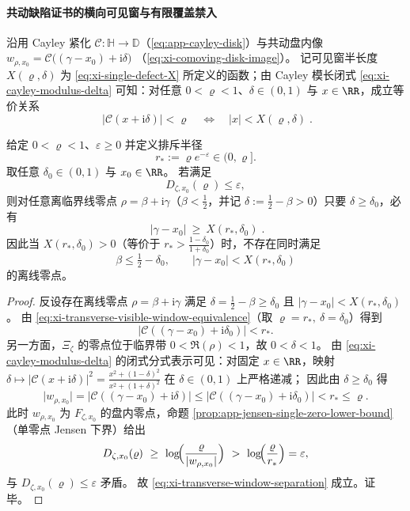 \paragraph{共动缺陷证书的横向可见窗与有限覆盖禁入}\label{par:xi-comoving-transverse-window-band-exclusion}
沿用 Cayley 紧化 \(\mathcal{C}:\mathbb{H}\to\mathbb{D}\)（\eqref{eq:app-cayley-disk}）与共动盘内像
\(
w_{\rho,x_0}=\mathcal{C}\bigl((\gamma-x_0)+\mathrm{i}\delta\bigr)
\)
（\eqref{eq:xi-comoving-disk-image}）。
记可见窗半长度 \(X(\varrho,\delta)\) 为 \eqref{eq:xi-single-defect-X} 所定义的函数；由 Cayley 模长闭式 \eqref{eq:xi-cayley-modulus-delta} 可知：对任意 \(0<\varrho<1\)、\(\delta\in(0,1)\) 与 \(x\in\RR\)，成立等价关系
\begin{equation}\label{eq:xi-transverse-visible-window-equivalence}
\boxed{\;
\bigl|\mathcal{C}(x+\mathrm{i}\delta)\bigr|<\varrho
\quad\Longleftrightarrow\quad
|x|<X(\varrho,\delta)\; }.
\end{equation}

\begin{theorem}\label{thm:xi-comoving-defect-transverse-visible-window}
给定 \(0<\varrho<1\)、\(\varepsilon\ge 0\) 并定义排斥半径
\[
r_\ast:=\varrho e^{-\varepsilon}\in(0,\varrho].
\]
取任意 \(\delta_0\in(0,1)\) 与 \(x_0\in\RR\)。
若满足
\[
D_{\zeta,x_0}(\varrho)\le \varepsilon,
\]
则对任意离临界线零点 \(\rho=\beta+\mathrm{i}\gamma\)（\(\beta<\tfrac12\)，并记 \(\delta:=\tfrac12-\beta>0\)）只要 \(\delta\ge\delta_0\)，必有
\begin{equation}\label{eq:xi-transverse-window-separation}
\boxed{\;
|\gamma-x_0|\ \ge\ X(r_\ast,\delta_0)\; }.
\end{equation}
因此当 \(X(r_\ast,\delta_0)>0\)（等价于 \(r_\ast>\frac{1-\delta_0}{1+\delta_0}\)）时，不存在同时满足
\[
\beta\le\tfrac12-\delta_0,
\qquad
|\gamma-x_0|<X(r_\ast,\delta_0)
\]
的离线零点。
\end{theorem}

\begin{proof}
反设存在离线零点 \(\rho=\beta+\mathrm{i}\gamma\) 满足 \(\delta=\tfrac12-\beta\ge\delta_0\) 且
\(
|\gamma-x_0|<X(r_\ast,\delta_0)
\)。
由 \eqref{eq:xi-transverse-visible-window-equivalence}（取 \(\varrho=r_\ast,\ \delta=\delta_0\)）得到
\[
\bigl|\mathcal{C}((\gamma-x_0)+\mathrm{i}\delta_0)\bigr|<r_\ast.
\]
另一方面，\(\Xi_{\zeta}\) 的零点位于临界带 \(0<\Re(\rho)<1\)，故 \(0<\delta<1\)。
由 \eqref{eq:xi-cayley-modulus-delta} 的闭式分式表示可见：对固定 \(x\in\RR\)，映射
\(
\delta\mapsto |\mathcal{C}(x+\mathrm{i}\delta)|^2
=\frac{x^2+(1-\delta)^2}{x^2+(1+\delta)^2}
\)
在 \(\delta\in(0,1)\) 上严格递减；
因此由 \(\delta\ge\delta_0\) 得
\[
\bigl|w_{\rho,x_0}\bigr|
=\bigl|\mathcal{C}((\gamma-x_0)+\mathrm{i}\delta)\bigr|
\le \bigl|\mathcal{C}((\gamma-x_0)+\mathrm{i}\delta_0)\bigr|
<r_\ast\le\varrho.
\]
此时 \(w_{\rho,x_0}\) 为 \(F_{\zeta,x_0}\) 的盘内零点，命题 \ref{prop:app-jensen-single-zero-lower-bound}（单零点 Jensen 下界）给出
\[
D_{\zeta,x_0}(\varrho)\ \ge\ \log\!\Bigl(\frac{\varrho}{|w_{\rho,x_0}|}\Bigr)\ >\ \log\!\Bigl(\frac{\varrho}{r_\ast}\Bigr)=\varepsilon,
\]
与 \(D_{\zeta,x_0}(\varrho)\le\varepsilon\) 矛盾。
故 \eqref{eq:xi-transverse-window-separation} 成立。证毕。
\end{proof}

